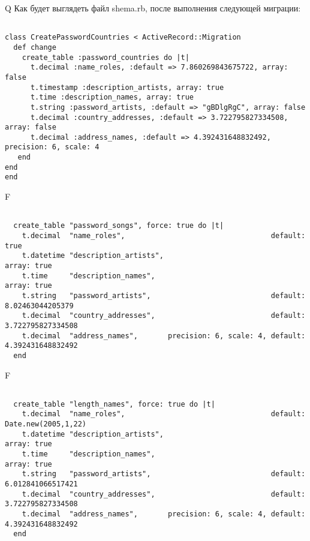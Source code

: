 Q
Как будет выглядеть файл shema.rb, после выполнения следующей миграции:

\begin{verbatim}

class CreatePasswordCountries < ActiveRecord::Migration 
  def change 
    create_table :password_countries do |t| 
      t.decimal :name_roles, :default => 7.860269843675722, array: false
      t.timestamp :description_artists, array: true
      t.time :description_names, array: true
      t.string :password_artists, :default => "gBDlgRgC", array: false
      t.decimal :country_addresses, :default => 3.722795827334508, array: false
      t.decimal :address_names, :default => 4.392431648832492, precision: 6, scale: 4
   end
end
end
\end{verbatim}

F
\begin{verbatim}

  create_table "password_songs", force: true do |t|
    t.decimal  "name_roles",                                  default: true
    t.datetime "description_artists",                                                     array: true
    t.time     "description_names",                                                       array: true
    t.string   "password_artists",                            default: 8.02463044205379
    t.decimal  "country_addresses",                           default: 3.722795827334508
    t.decimal  "address_names",       precision: 6, scale: 4, default: 4.392431648832492
  end

\end{verbatim}

F
\begin{verbatim}

  create_table "length_names", force: true do |t|
    t.decimal  "name_roles",                                  default: Date.new(2005,1,22)
    t.datetime "description_artists",                                                     array: true
    t.time     "description_names",                                                       array: true
    t.string   "password_artists",                            default: 6.012841066517421
    t.decimal  "country_addresses",                           default: 3.722795827334508
    t.decimal  "address_names",       precision: 6, scale: 4, default: 4.392431648832492
  end

\end{verbatim}

